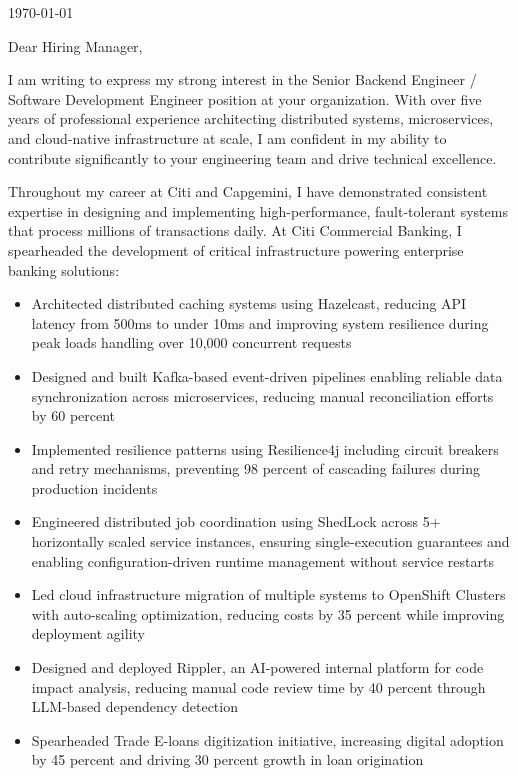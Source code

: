 \documentclass[]{hanisntsolo-resume}
\begin{document}
\vspace*{-0.5in}

\begin{flushright}
\today
\end{flushright}

\vspace{0.3in}

Dear Hiring Manager,

\vspace{0.2in}

I am writing to express my strong interest in the Senior Backend Engineer / Software Development Engineer position at your organization. With over five years of professional experience architecting distributed systems, microservices, and cloud-native infrastructure at scale, I am confident in my ability to contribute significantly to your engineering team and drive technical excellence.

\vspace{0.15in}

Throughout my career at Citi and Capgemini, I have demonstrated consistent expertise in designing and implementing high-performance, fault-tolerant systems that process millions of transactions daily. At Citi Commercial Banking, I spearheaded the development of critical infrastructure powering enterprise banking solutions:

\vspace{0.1in}

\begin{itemize}
\setlength\itemsep{0.05in}
\item Architected distributed caching systems using Hazelcast, reducing API latency from 500ms to under 10ms and improving system resilience during peak loads handling over 10,000 concurrent requests
\item Designed and built Kafka-based event-driven pipelines enabling reliable data synchronization across microservices, reducing manual reconciliation efforts by 60 percent
\item Implemented resilience patterns using Resilience4j including circuit breakers and retry mechanisms, preventing 98 percent of cascading failures during production incidents
\item Engineered distributed job coordination using ShedLock across 5+ horizontally scaled service instances, ensuring single-execution guarantees and enabling configuration-driven runtime management without service restarts
\item Led cloud infrastructure migration of multiple systems to OpenShift Clusters with auto-scaling optimization, reducing costs by 35 percent while improving deployment agility
\item Designed and deployed Rippler, an AI-powered internal platform for code impact analysis, reducing manual code review time by 40 percent through LLM-based dependency detection
\item Spearheaded Trade E-loans digitization initiative, increasing digital adoption by 45 percent and driving 30 percent growth in loan origination
\end{itemize}
\end{document}
